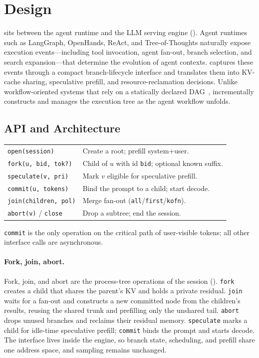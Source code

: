 \section{Design}
\label{sec:design}

\sys sits between the agent runtime and the LLM serving engine ().
Agent runtimes such as LangGraph, OpenHands, ReAct, and Tree-of-Thoughts naturally expose execution events---including tool invocation, agent fan-out, branch selection, and search expansion---that determine the evolution of agent contexts.
\sys captures these events through a compact branch-lifecycle interface and translates them into KV-cache sharing, speculative prefill, and resource-reclamation decisions.
Unlike workflow-oriented systems that rely on a statically declared DAG~\cite{ayo,parrot,murakkab}, \sys incrementally constructs and manages the execution tree as the agent workflow unfolds.

\subsection{API and Architecture}
\label{sec:overview}

\begin{center}
\footnotesize
\setlength{\tabcolsep}{3pt}
\begin{tabular}{@{}lp{}@{}}
\toprule
\texttt{open(session)} & Create a root; prefill system+user. \\
\texttt{fork(u, bid, tok?)} & Child of $u$ with id \texttt{bid}; optional known suffix. \\
\texttt{speculate(v, pri)} & Mark $v$ eligible for speculative prefill. \\
\texttt{commit(u, tokens)} & Bind the prompt to a child; start decode. \\
\texttt{join(children, pol)} & Merge fan-out (\texttt{all}/\texttt{first}/\texttt{kofn}). \\
\texttt{abort(v)} / \texttt{close} & Drop a subtree; end the session. \\
\bottomrule
\end{tabular}
\end{center}

\texttt{commit} is the only operation on the critical path of user-visible tokens; all other interface calls are asynchronous.

\paragraph{Fork, join, abort.}
Fork, join, and abort are the process-tree operations of the session ().
\texttt{fork} creates a child that shares the parent's KV and holds a private residual.
\texttt{join} waits for a fan-out and constructs a new committed node from the children's results, reusing the shared trunk and prefilling only the unshared tail.
\texttt{abort} drops unused branches and reclaims their residual memory.
\texttt{speculate} marks a child for idle-time speculative prefill; \texttt{commit} binds the prompt and starts decode.
The interface lives inside the engine, so branch state, scheduling, and prefill share one address space, and sampling remains unchanged.

